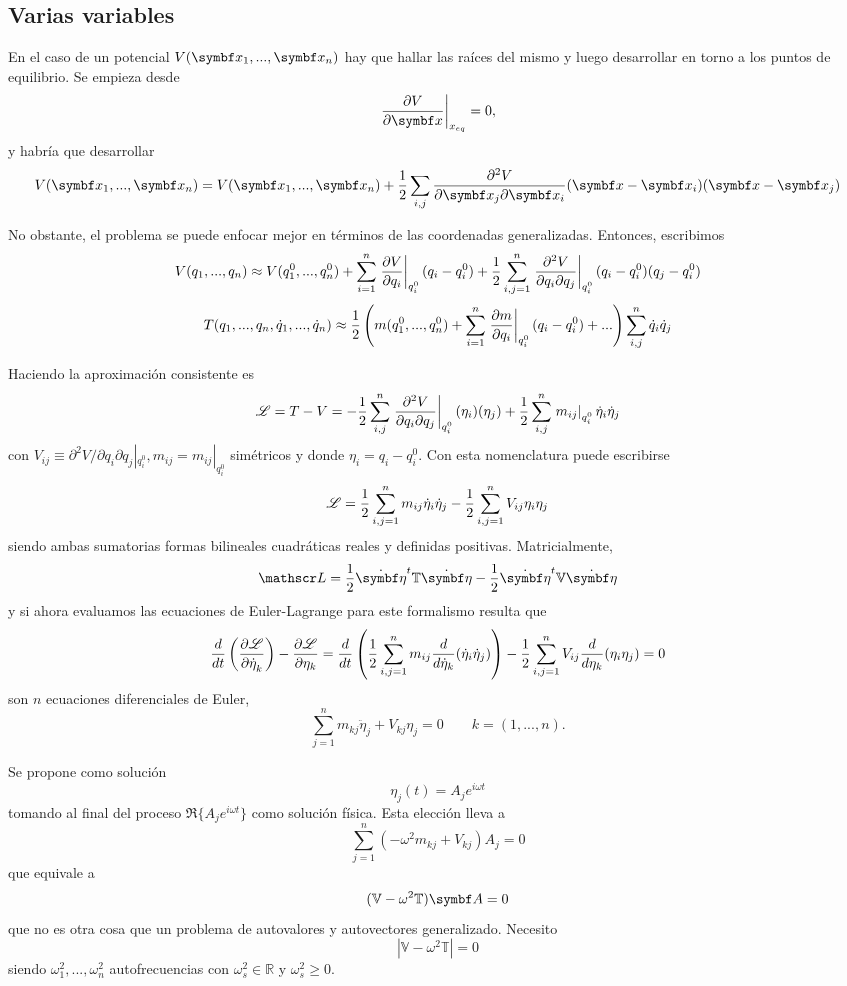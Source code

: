 \documentclass[10pt,oneside]{CBFT_book}
\begin{document}
\subsection{Varias variables}

En el caso de un potencial $V(\vb{x}_1, ...,\vb{x}_n)$ hay que hallar las raíces del mismo y luego desarrollar en torno a los puntos
de equilibrio. Se empieza desde 
\[
	\dpare{V}{\vb{x}}{x_{eq}} = 0,
\]
y habría que desarrollar 
\[
	V( \vb{x}_1, ...,\vb{x}_n ) = V( \vb{x}_1, ...,\vb{x}_n ) + 
	\frac 1 2 \sum_{i,j} \dparcru{V}{\vb{x}_i}{\vb{x}_j}(\vb{x}-\vb{x}_i)(\vb{x}-\vb{x}_j)
\]

No obstante, el problema se puede enfocar mejor en términos de las coordenadas generalizadas. Entonces, escribimos
\[
	V(q_1,...,q_n) \approx V(q_1^0,...,q_n^0) + \sum_{i=1}^n \left. \dpar{V}{q_i} \right|_{q_i^0} (q_i - q_i^0)
		+ \frac{1}{2} \sum_{i,j=1}^n \left. \dparcru{V}{q_j}{q_i}\right|_{q_i^0}(q_i -q_i^0)(q_j -q_i^0)
\]
\[
	T(q_1,...,q_n,\dot{q}_1,...,\dot{q}_n) \approx \frac{1}{2} \left( m(q_1^0,...,q_n^0) + \sum_{i=1}^n 
				\left. \dpar{m}{q_i} \right|_{q_i^0} (q_i - q_i^0) + ... \right) \sum_{i,j}^n \dot{q}_i\dot{q}_j
\]

Haciendo la aproximación consistente es
\[
	\Lag = T - V = - \frac{1}{2} \sum_{i,j}^n \left. \dparcru{V}{q_j}{q_i}\right|_{q_i^0}(\eta_i)(\eta_j) +
		\frac{1}{2} \sum_{i,j}^n \left. m_{ij}\right|_{q_i^0} \dot{\eta}_i \dot{\eta}_j
\]
con $V_{ij} \equiv \partial^2 V/ \partial q_i \partial q_j |_{q_i^0} , m_{ij} = m_{ij}|_{q_i^0}$ simétricos 
y donde $\eta_i = q_i - q_i^0$. Con esta nomenclatura puede escribirse
\[
	\Lag = \frac{1}{2} \sum_{i,j=1}^n m_{ij} \dot{\eta}_i \dot{\eta}_j - \frac{1}{2} \sum_{i,j=1}^n V_{ij} \eta_i \eta_j
\]
siendo ambas sumatorias formas bilineales cuadráticas reales y definidas positivas. Matricialmente,
\[
	\Lag = \frac{1}{2} \dot{\vb{\eta}}^t \mathbb{T} \dot{\vb{\eta}} - \frac{1}{2} \dot{\vb{\eta}}^t \mathbb{V} \dot{\vb{\eta}}
\]
y si ahora evaluamos las ecuaciones de Euler-Lagrange para este formalismo resulta que 
\[
	\frac{d}{dt}\left( \dpar{\Lag}{\dot{\eta}_k} \right) - \dpar{\Lag}{\eta_k} = 
		\frac{d}{dt} \left( \frac{1}{2} \sum_{i,j=1}^n m_{ij} \frac{d}{d\dot{\eta}_k}(\dot{\eta}_i \dot{\eta}_j) \right) - 
		\frac{1}{2} \sum_{i,j=1}^n V_{ij} \frac{d}{d\eta_k} (\eta_i \eta_j) = 0
\]
son $n$ ecuaciones diferenciales de Euler, 
\[
	\sum_{j=1}^n m_{kj} \ddot{\eta}_j + V_{kj} \eta_j = 0 \qquad k=(1,...,n).
\]

Se propone como solución 
\[
	\eta_j(t)  = A_j e^{i\omega t}
\]
tomando al final del proceso $\Re\{A_j e^{i\omega t}\}$ como solución física. Esta elección lleva a
\[
	\sum_{j=1}^n ( - \omega^2 m_{kj} + V_{kj} ) A_j = 0
\]
que equivale a
\[
	(\mathbb{V} -\omega^2\mathbb{T})\vb{A} = 0
\]
que no es otra cosa que un problema de autovalores y autovectores generalizado. Necesito
\[
	\left| \mathbb{V} -\omega^2\mathbb{T} \right| = 0
\]
siendo $\omega^2_1, ...,\omega^2_n$ autofrecuencias con $\omega^2_s \in \mathbb{R}$ y $\omega^2_s \geq 0$.
\end{document}
